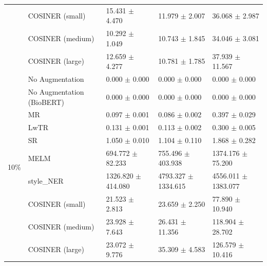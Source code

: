 \documentclass{article}
\begin{document}
\begin{table}
{\begin{tabular}{@{}cp{}p{}p{}p{}@{}}
&COSINER (small) & 15.431 $\pm$ 4.470 & 11.979 $\pm$ 2.007 & 36.068 $\pm$ 2.987 \\
&COSINER (medium) & 10.292 $\pm$ 1.049 & 10.743 $\pm$ 1.845 & 34.046 $\pm$ 3.081 \\
&COSINER (large) & 12.659 $\pm$ 4.277 & 10.781 $\pm$ 1.785 & 37.939 $\pm$ 11.567 \\
\midrule
\multirow{10}{*}{10\%} & No Augmentation & 0.000 $\pm$ 0.000 & 0.000 $\pm$ 0.000 & 0.000 $\pm$ 0.000 \\
&No Augmentation (BioBERT) & 0.000 $\pm$ 0.000 & 0.000 $\pm$ 0.000 & 0.000 $\pm$ 0.000 \\
&MR & 0.097 $\pm$ 0.001 & 0.086 $\pm$ 0.002 & 0.397 $\pm$ 0.029 \\
&LwTR & 0.131 $\pm$ 0.001 & 0.113 $\pm$ 0.002 & 0.300 $\pm$ 0.005 \\
&SR & 1.050 $\pm$ 0.010 & 1.104 $\pm$ 0.110 & 1.868 $\pm$ 0.282 \\
&MELM & 694.772 $\pm$ 82.233 & 755.496 $\pm$ 403.938 & 1374.176 $\pm$ 75.200 \\
&style\_NER & 1326.820 $\pm$ 414.080 & 4793.327 $\pm$ 1334.615 & 4556.011 $\pm$ 1383.077 \\
&COSINER (small) & 21.523 $\pm$ 2.813 & 23.659 $\pm$ 2.250 & 77.890 $\pm$ 10.940 \\
&COSINER (medium) & 23.928 $\pm$ 7.643 & 26.431 $\pm$ 11.356 & 118.904 $\pm$ 28.702 \\
&COSINER (large) & 23.072 $\pm$ 9.776 & 35.309 $\pm$ 4.583 & 126.579 $\pm$ 10.416 \\\bottomrule
    \end{tabular}}
    \end{table}
\end{document}
